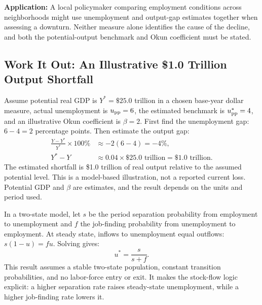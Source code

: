 \documentclass[11pt,letterpaper]{article}
\begin{document}
\noindent\textbf{Application:} A local policymaker comparing employment conditions across neighborhoods might use unemployment and output-gap estimates together when assessing a downturn. Neither measure alone identifies the cause of the decline, and both the potential-output benchmark and Okun coefficient must be stated.

\subsection{Work It Out: An Illustrative \$1.0 Trillion Output Shortfall}
Assume potential real GDP is $Y^*=\$25.0$ trillion in a chosen base-year dollar measure, actual unemployment is $u_{\rm pp}=6$, the estimated benchmark is $u^*_{\rm pp}=4$, and an illustrative Okun coefficient is $\beta=2$. First find the unemployment gap: $6-4=2$ percentage points. Then estimate the output gap:
\begin{align}
\frac{Y-Y^*}{Y^*}\times100\% &\approx -2(6-4)=-4\%,\\
Y^*-Y &\approx 0.04\times \$25.0\text{ trillion}
=\$1.0\text{ trillion}.
\end{align}
The estimated shortfall is \$1.0 trillion of real output relative to the assumed potential level. This is a model-based illustration, not a reported current loss. Potential GDP and $\beta$ are estimates, and the result depends on the units and period used.

\begin{tcolorbox}[colback=blue!5!white,colframe=blue!75!black,title=\textbf{Optional Advanced: Markov Job-Finding and Separation Flows}]
\small
In a two-state model, let $s$ be the period separation probability from employment to unemployment and $f$ the job-finding probability from unemployment to employment. At steady state, inflows to unemployment equal outflows: $s(1-u)=fu$. Solving gives:
\[
u^*=\frac{s}{s+f}.
\]
This result assumes a stable two-state population, constant transition probabilities, and no labor-force entry or exit. It makes the stock-flow logic explicit: a higher separation rate raises steady-state unemployment, while a higher job-finding rate lowers it.
\end{tcolorbox}
\end{document}
